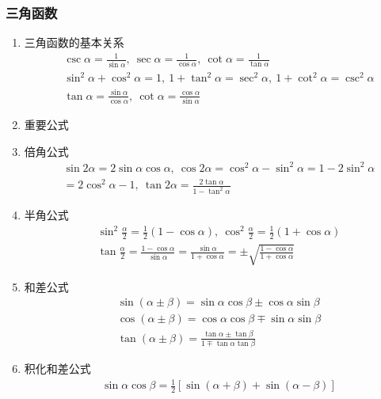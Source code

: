 \subsubsection{三角函数}
\begin{enumerate}
    \item 三角函数的基本关系
          \[ \begin{split}&\csc \alpha=\frac{1}{\sin \alpha},\ \sec \alpha=\frac{1}{\cos \alpha},\ \cot \alpha=\frac{1}{\tan \alpha}\\& \sin^{2}\alpha +\cos^{2}\alpha =1,\ 1+\tan^{2}\alpha = \sec^{2}\alpha,\ 1+\cot^{2}\alpha =\csc^{2}\alpha\\ &\tan \alpha=\frac{\sin \alpha}{\cos \alpha},\ \cot \alpha=\frac{\cos \alpha}{\sin \alpha}\end{split}\]
    \item 重要公式
    \item 倍角公式
          \[ \begin{split}
                  & \sin 2\alpha=2\sin \alpha \cos \alpha,\ \cos 2\alpha =\cos^{2}\alpha -\sin^{2}\alpha =1-2\sin^{2}\alpha\\&=2\cos^{2}\alpha -1,\ \tan 2\alpha =\frac{2\tan \alpha}{1-\tan^{2}\alpha}
              \end{split} \]
    \item 半角公式
          \[ \begin{split}
                  & \sin^{2}\frac{\alpha}{2}=\frac{1}{2}(1-\cos \alpha),\ \cos^{2}\frac{\alpha}{2}=\frac{1}{2}(1+\cos \alpha) \\
                  & \tan \frac{\alpha}{2}=\frac{1-\cos \alpha}{\sin \alpha}=\frac{\sin \alpha}{1+\cos \alpha}=\pm \sqrt{\frac{1-\cos \alpha}{1+\cos \alpha}}
              \end{split} \]
    \item 和差公式
          \[ \begin{split}
                  & \sin(\alpha \pm \beta)=\sin\alpha\cos\beta \pm \cos\alpha\sin\beta \\
                  & \cos(\alpha \pm \beta)=\cos\alpha\cos\beta \mp \sin\alpha\sin\beta \\
                  & \tan(\alpha \pm \beta)=\frac{\tan\alpha \pm \tan\beta}{1 \mp \tan\alpha\tan\beta}
              \end{split} \]
    \item 积化和差公式
          \[ \begin{split}
                  & \sin\alpha\cos\beta = \frac{1}{2}[\sin(\alpha + \beta) + \sin(\alpha - \beta)] \\

\end{split}\]
\end{enumerate}
